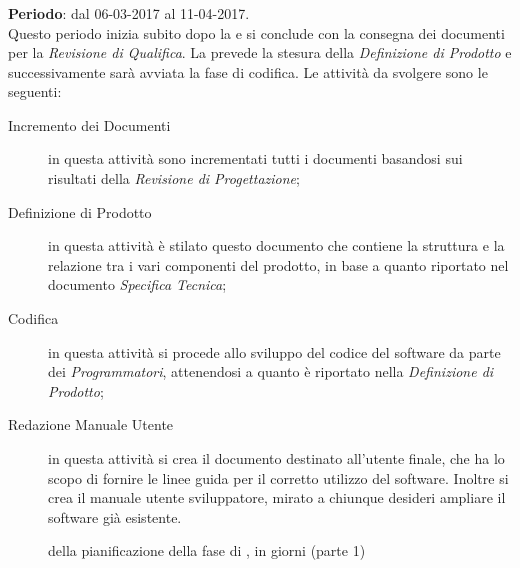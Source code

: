 	\subsubsection{\PDC} \label{sec:PDC}
	\textbf{Periodo}: dal 06-03-2017 al 11-04-2017.	
	\\ Questo periodo inizia subito dopo la \PA{} e si conclude con la consegna dei documenti per la \emph{Revisione di Qualifica}. La \PDC{} prevede la stesura della \emph{Definizione di Prodotto} e successivamente sarà avviata la fase di codifica. Le attività da svolgere sono le seguenti:
	\begin{description}
		\item[Incremento dei Documenti] in questa attività sono incrementati tutti i documenti basandosi sui risultati della \emph{Revisione di Progettazione}; 
		\item[Definizione di Prodotto] in questa attività è stilato questo documento che contiene la struttura e la relazione tra i vari componenti del prodotto, in base a quanto riportato nel documento \emph{Specifica Tecnica};
		\item[Codifica] in questa attività si procede allo sviluppo del codice del software da parte dei \emph{Programmatori}, attenendosi a quanto è riportato nella \emph{Definizione di Prodotto}; 
		\item[Redazione Manuale Utente] in questa attività si crea il documento destinato all'utente finale, che ha lo scopo di fornire le linee guida per il corretto utilizzo del software. Inoltre si crea il manuale utente sviluppatore, mirato a chiunque desideri ampliare il software già esistente.
	\end{description}
	
\begin{figure}[H]
\label{tab:ganttpa1}
\caption{ della pianificazione della fase di \PDC, in giorni (parte 1)}
\end{figure}

